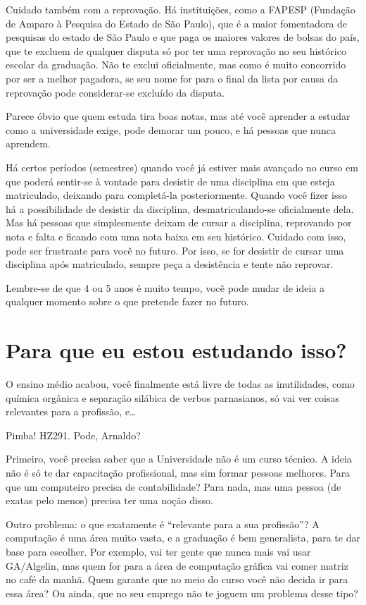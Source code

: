 Cuidado também com a reprovação. Há instituições, como a FAPESP (Fundação de
Amparo à Pesquisa do Estado de São Paulo), que é a maior fomentadora de pesquisas
do estado de São Paulo e que paga os maiores valores de bolsas do país, que te
excluem de qualquer disputa só por ter uma reprovação no seu histórico escolar da
graduação. Não te exclui oficialmente, mas como é muito concorrido por ser
a melhor pagadora, se seu nome for para o final da lista por causa da reprovação
pode considerar-se excluído da disputa.

Parece óbvio que quem estuda tira boas notas, mas até você aprender a estudar como
a universidade exige, pode demorar um pouco, e há pessoas que nunca aprendem.

Há certos períodos (semestres) quando você já estiver mais avançado no curso em
que poderá sentir-se à vontade para desistir de uma disciplina em que esteja
matriculado, deixando para completá-la posteriormente. Quando você fizer isso há
a possibilidade de desistir da disciplina, desmatriculando-se oficialmente dela.
Mas há pessoas que simplesmente deixam de cursar a disciplina, reprovando por
nota e falta e ficando com uma nota baixa em seu histórico. Cuidado com isso,
pode ser frustrante para você no futuro. Por isso, se for desistir de cursar uma
disciplina após matriculado, sempre peça a desistência e tente não reprovar.

Lembre-se de que 4 ou 5 anos é muito tempo, você pode mudar de ideia a qualquer
momento sobre o que pretende fazer no futuro.

\section{Para que eu estou estudando isso?}

O ensino médio acabou, você finalmente está livre de todas as inutilidades, como
química orgânica e separação silábica de verbos parnasianos, só vai ver coisas
relevantes para a profissão, e{\dots}

Pimba! HZ291. Pode, Arnaldo?

Primeiro, você precisa saber que a Universidade não é um curso técnico. A ideia
não é só te dar capacitação profissional, mas sim formar pessoas melhores. Para
que um computeiro precisa de contabilidade? Para nada, mas uma pessoa (de exatas
pelo menos) precisa ter uma noção disso.

Outro problema: o que exatamente é ``relevante para a sua profissão''?
A computação é uma área muito vasta, e a graduação
é bem generalista, para te dar base para escolher. Por exemplo,
vai ter gente que nunca mais vai usar GA/Algelin, mas quem for para a área de
computação gráfica vai comer matriz no café da manhã. Quem garante que no meio
do curso você não decida ir para essa área? Ou ainda, que no seu emprego não te
joguem um problema desse tipo?

